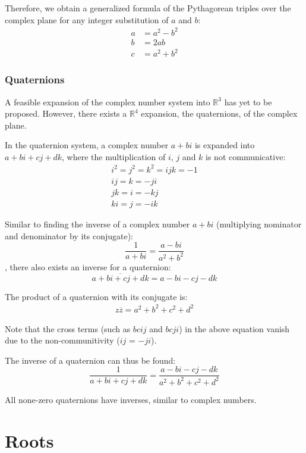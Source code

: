 \documentclass[12pt]{article}
\begin{document}
	Therefore, we obtain a generalized formula of the Pythagorean triples over the complex plane for any integer substitution of $a$ and $b$:
	\begin{align*}
		a &= a^2 - b^2 \\
		b &= 2ab \\
		c &= a^2 + b^2
	\end{align*}
	
	
	\subsubsection{Quaternions}
	
	A feasible expansion of the complex number system into $\mathbb{R}^3$ has yet to be proposed. However, there exists a $\mathbb{R}^4$ expansion, the quaternions, of the complex plane.
	
	In the quaternion system, a complex number $a + bi$ is expanded into $a + bi + cj + dk$, where the multiplication of $i$, $j$ and $k$ is not communicative:
	\begin{gather*}
		i^2 = j^2 = k^2 = ijk = -1 \\
		ij = k = -ji \\
		jk = i = -kj \\
		ki = j = -ik
	\end{gather*}
	
	Similar to finding the inverse of a complex number $a + bi$ (multiplying nominator and denominator by its conjugate):
	$$\frac{1}{a + bi} = \frac{a - bi}{a^2 + b^2}$$
	, there also exists an inverse for a quaternion:
	$$\overline{a + bi + cj + dk} = a - bi - cj - dk$$
	
	The product of a quaternion with its conjugate is:
	\begin{align*}
		z\overline{z} = a^2 + b^2 + c^2 + d^2
	\end{align*}
	
	Note that the cross terms (such as $bcij$ and $bcji$) in the above equation vanish due to the non-communitivity ($ij$ = $-ji$).
	
	The inverse of a quaternion can thus be found:
	$$\frac{1}{a + bi + cj + dk} = \frac{a - bi - cj - dk}{a^2 + b^2 + c^2 + d^2}$$
	
	All none-zero quaternions have inverses, similar to complex numbers.
	
	\section{Roots}
	
\end{document}
